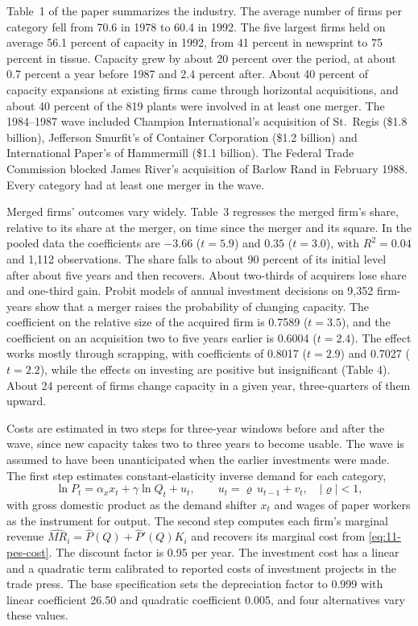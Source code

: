 Table~1 of the paper summarizes the industry. The average number of firms per category fell from 70.6 in 1978 to 60.4
in 1992. The five largest firms held on average 56.1 percent of capacity in 1992, from 41 percent in newsprint to 75
percent in tissue. Capacity grew by about 20 percent over the period, at about 0.7 percent a year before 1987 and 2.4
percent after. About 40 percent of capacity expansions at existing firms came through horizontal acquisitions, and about
40 percent of the 819 plants were involved in at least one merger. The 1984--1987 wave included Champion
International's acquisition of St.~Regis (\$1.8 billion), Jefferson Smurfit's of Container Corporation (\$1.2 billion)
and International Paper's of Hammermill (\$1.1 billion). The Federal Trade Commission blocked James River's acquisition
of Barlow Rand in February 1988. Every category had at least one merger in the wave.

Merged firms' outcomes vary widely. Table~3 regresses the merged firm's share, relative to its share at the merger, on
time since the merger and its square. In the pooled data the coefficients are $-3.66$ ($t = 5.9$) and $0.35$ ($t =
3.0$), with $R^2 = 0.04$ and 1,112 observations. The share falls to about 90 percent of its initial level after about five
years and then recovers. About two-thirds of acquirers lose share and one-third gain. Probit models of annual investment
decisions on 9,352 firm-years show that a merger raises the probability of changing capacity. The coefficient on the
relative size of the acquired firm is 0.7589 ($t = 3.5$), and the coefficient on an acquisition two to five years
earlier is 0.6004 ($t = 2.4$). The effect works mostly through scrapping, with coefficients of 0.8017 ($t = 2.9$) and 0.7027 ($t = 2.2$), while
the effects on investing are positive but insignificant (Table 4). About 24 percent of firms change capacity in a given
year, three-quarters of them upward.

Costs are estimated in two steps for three-year windows before and after the wave, since new capacity takes two to
three years to become usable. The wave is assumed to have been unanticipated when the earlier investments were made.
The first step estimates constant-elasticity inverse demand for each category,
\begin{equation}\label{eq:11-pes-demand}
\ln P_t = \alpha_x x_t + \gamma \ln Q_t + u_t, \qquad u_t = \varrho\, u_{t-1} + v_t, \quad |\varrho| < 1,
\end{equation}
with gross domestic product as the demand shifter $x_t$ and wages of paper workers as the instrument for output. The
second step computes each firm's marginal revenue $\widehat{\mathit{MR}}_i = \hat P(Q) + \hat P'(Q)K_i$ and recovers its
marginal cost from \eqref{eq:11-pes-cost}. The discount factor is 0.95 per year. The investment cost has a linear and
a quadratic term calibrated to reported costs of investment projects in the trade press. The base specification sets
the depreciation factor to 0.999 with linear coefficient 26.50 and quadratic coefficient 0.005, and four alternatives
vary these values.

